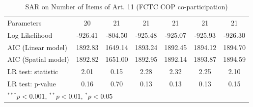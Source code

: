 \begin{table}[!h]
\begin{center}
\begin{tabular}{l c c c c c c }
Parameters              & 20           & 21           & 21           & 21           & 21           & 21           \\
Log Likelihood          & -926.41      & -804.50      & -925.48      & -925.07      & -925.93      & -926.30      \\
AIC (Linear model)      & 1892.83      & 1649.14      & 1893.24      & 1892.45      & 1894.12      & 1894.70      \\
AIC (Spatial model)     & 1892.82      & 1651.00      & 1892.95      & 1892.14      & 1893.87      & 1894.59      \\
LR test: statistic      & 2.01         & 0.15         & 2.28         & 2.32         & 2.25         & 2.10         \\
LR test: p-value        & 0.16         & 0.70         & 0.13         & 0.13         & 0.13         & 0.15         \\
\bottomrule
\multicolumn{7}{l}{\scriptsize{$^{***}p<0.001$, $^{**}p<0.01$, $^*p<0.05$}}
\end{tabular}
\caption{SAR on Number of Items of Art. 11 (FCTC COP co-participation)}
\label{table:coefficients}
\end{center}
\end{table}
